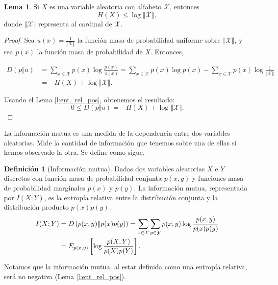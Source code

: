 \documentclass[12pt,a4paper]{report} %
\theoremstyle{definition}
\newtheorem{definition}{Definición}[section]
\newtheorem{lemma}[theorem]{Lema}
\begin{document}
\begin{lemma}
  Si $X$ es una variable aleatoria con alfabeto $\mathcal{X}$, entonces \[
  H(X) \leq \log{\left\Vert\mathcal{X}\right\Vert}, 
  \]
donde $\left\Vert\mathcal{X}\right\Vert$ representa al cardinal de $\mathcal{X}$.
\end{lemma}
\begin{proof}
  Sea $u(x) = \frac{1}{\left\Vert\mathcal{X}\right\Vert}$ la función masa de probabilidad uniforme sobre $\left\Vert\mathcal{X}\right\Vert$, y sea $p(x)$ la función masa de probabilidad de $X$. Entonces,
  
 \begin{align*}
   D \left ( p \Vert u \right ) &= \sum_{x \in \mathcal{X}}
   p(x) \log \frac{p(x)}{u(x)} = \sum_{x \in \mathcal{X}} p(x) \log p(x) - \sum_{x \in \mathcal{X}} p(x) \log \frac{1}{\left\Vert\mathcal{X}\right\Vert}\\
  &= -H(X) + \log \left\Vert\mathcal{X}\right\Vert.
 \end{align*}
 
    Usando el Lema \ref{l:ent_rel_pos}, obtenemos el resultado: \[
0 \leq D\left ( p \Vert u \right ) = -H(X) + \log \left\Vert\mathcal{X}\right\Vert.
    \]
\end{proof}

La información mutua es una medida de la dependencia entre dos variables aleatorias. Mide la cantidad de información que tenemos sobre una de ellas si hemos observado la otra. Se define como sigue.

\begin{definition}[Información mutua]\label{def:im_disc}
  Dadas dos variables aleatorias $X$ e $Y$ discretas con función masa de probabilidad conjunta $p(x,y)$ y funciones masa de probabilidad marginales $p(x)$ y $p(y)$. La información mutua, representada por $I(X;Y)$, es la entropía relativa entre la distribución conjunta y la distribución producto $p(x)p(y)$.
  \begin{align*}
  I(X;Y) &= D \left ( p(x,y) \Vert p(x)p(y) \right ) = \sum_{x \in \mathcal{X}}\sum_{y \in \mathcal{Y}} p(x,y) \log \frac{p(x,y)}{p(x)p(y)}\\ &= \relax{E}_{p(x,y)} \left [ \log \frac{p(X,Y)}{p(X)p(Y)}\right].\\
  \end{align*}
\end{definition}

Notamos que la información mutua, al estar definida como una entropía relativa, será no negativa (Lema \ref{l:ent_rel_pos}).\\
\end{document}
